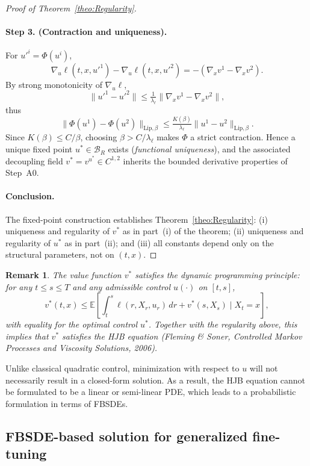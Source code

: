 \documentclass[11pt]{article}
\newtheorem{remark}{Remark}[section]
\begin{document}
\begin{proof}[Proof of Theorem~\ref{theo:Regularity}]
\paragraph{Step 3. (Contraction and uniqueness).}
For $u'^i=\Phi(u^i)$,
\[
\nabla_u\ell(t,x,u'^1)-\nabla_u\ell(t,x,u'^2)
=-(\nabla_x v^1-\nabla_x v^2).
\]
By strong monotonicity of $\nabla_u\ell$,
\[
\|u'^1-u'^2\|
\le\tfrac{1}{\lambda_\ell}\|\nabla_x v^1-\nabla_x v^2\|,
\]
thus
\[
\|\Phi(u^1)-\Phi(u^2)\|_{\mathrm{Lip},\beta}
\le\tfrac{K(\beta)}{\lambda_\ell}\|u^1-u^2\|_{\mathrm{Lip},\beta}.
\]
Since $K(\beta)\le C/\beta$, choosing $\beta>C/\lambda_\ell$ makes $\Phi$ a strict contraction.  
Hence a unique fixed point $u^*\in\mathcal{B}_R$ exists (\emph{functional uniqueness}),  
and the associated decoupling field $v^*=v^{u^*}\in C^{1,2}$ inherits the bounded derivative properties of Step~A0.

\paragraph{Conclusion.}
The fixed-point construction establishes Theorem~\ref{theo:Regularity}:  
(i) uniqueness and regularity of $v^*$ as in part~(i) of the theorem;  
(ii) uniqueness and regularity of $u^*$ as in part~(ii);  
and (iii) all constants depend only on the structural parameters, not on $(t,x)$.
\end{proof}

\begin{remark}
The value function $v^*$ satisfies the dynamic programming principle:  
for any $t\le s\le T$ and any admissible control $u(\cdot)$ on $[t,s]$,
\[
v^*(t,x)
\le \mathbb{E}\!\left[\int_t^s \ell(r,X_r,u_r)\,dr + v^*(s,X_s)\;\big|\;X_t=x\right],
\]
with equality for the optimal control $u^*$.  
Together with the regularity above, this implies that $v^*$ satisfies the HJB equation 
(\textnormal{Fleming \& Soner, \emph{Controlled Markov Processes and Viscosity Solutions}, 2006}).
\end{remark}





Unlike classical quadratic control, minimization with respect to $u$ will not necessarily result in a closed-form solution. As a result, the HJB equation cannot be formulated to be a linear or semi-linear PDE, which leads to a probabilistic formulation in terms of FBSDEs.


\subsection{FBSDE-based solution for generalized fine-tuning}
\end{document}
